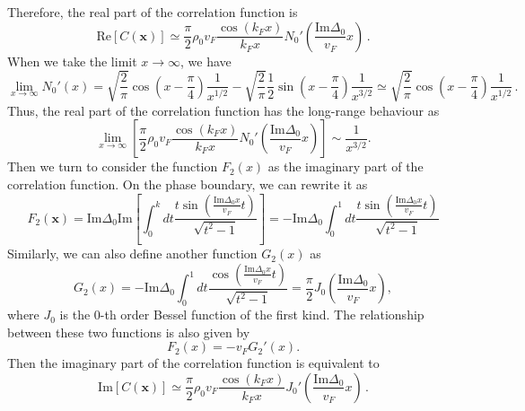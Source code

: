 \documentclass[aps,onecolumn,nofootinbib,superscriptaddress,notitlepage,longbibliography]{revtex4-1}
\begin{document}
Therefore, the real part of the correlation function is
\begin{equation}
	\mathrm{Re}[C(\bm{x})]\simeq\frac{\pi}{2} \rho_0v_F \frac{\cos (k_F x)}{k_Fx} N_0' \left( \frac{\text{Im}
		\Delta_0}{v_F} x \right)\,.
\end{equation}
When we take the limit $x \rightarrow \infty$, we have
\begin{equation}
	\lim_{x \rightarrow \infty} N_0' (x) = \sqrt{\frac{2}{\pi}} \cos \left( x -
	\frac{\pi}{4} \right) \frac{1}{x^{1 / 2}} - \sqrt{\frac{2}{\pi}} \frac{1}{2}
	\sin \left( x - \frac{\pi}{4} \right) \frac{1}{x^{3 / 2}} \simeq 
	\sqrt{\frac{2}{\pi}} \cos \left( x - \frac{\pi}{4} \right) \frac{1}{x^{1 /
			2}}\,.
	\label{Realexact}
\end{equation}
Thus, the real part of the correlation function has the long-range behaviour as
\begin{equation}
	\lim_{x \rightarrow \infty} \left[  \frac{\pi}{2} \rho_0 v_F \frac{\cos (k_F x)}{k_Fx}
	N_0' \left( \frac{\text{Im} \Delta_0}{v_F} x \right) \right] \sim \frac{1}{x^{3 / 2}}.
\end{equation}
Then we turn to consider the function $F_2(x)$ as the imaginary part of the correlation function. On the phase boundary, we can rewrite it as
\begin{equation}
	F_2(\bm{x})=\text{Im}\Delta_0\text{Im}\left[\int_0^{k} dt \frac{t\sin ( \frac{\text{Im}\Delta_0x}{v_F}
	t )}{ \sqrt{t^2 - 1}}\right]=-\text{Im}\Delta_0\int_0^{1} dt \frac{t\sin ( \frac{\text{Im}\Delta_0x}{v_F}
	t )}{ \sqrt{t^2 - 1}}
	\label{definition_of_F2}
\end{equation}
Similarly, we can also define another function $G_2(x)$ as
\begin{equation}
	G_2(x)=-\text{Im}\Delta_0\int_0^{1} dt \frac{\cos ( \frac{\text{Im}\Delta_0x}{v_F}
	t )}{ \sqrt{t^2 - 1}}=\frac{\pi}{2} J_0 \left( \frac{\text{Im}\Delta_0}{v_F} x \right),
\end{equation}
where $J_0$ is the 0-th order Bessel function of the first kind. The relationship between these two functions is also given by
\begin{equation}
	F_2 (x) = - v_F G_2' (x). %
\end{equation}
Then the imaginary part of the correlation function is equivalent to
\begin{equation}
	\mathrm{Im}[C(\bm{x})]\simeq\frac{\pi}{2} \rho_0 v_F\frac{\cos (k_F x)}{k_Fx} J_0' \left( \frac{\text{Im}
		\Delta_0}{v_F} x \right)\,.
\end{equation}
\end{document}
